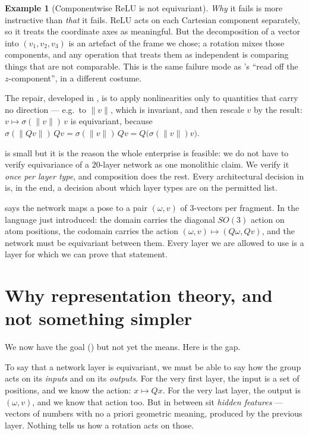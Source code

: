 \documentclass[11pt,a4paper]{report}
\theoremstyle{definition}
\newtheorem{example}[example]{Example}
\theoremstyle{remark}
\begin{document}
\begin{example}[Componentwise $\mathrm{ReLU}$ is not equivariant]
\emph{Why} it fails is more instructive than \emph{that} it fails.
$\mathrm{ReLU}$ acts on each Cartesian component separately, so it treats
the coordinate axes as meaningful. But the decomposition of a vector into
$(v_1,v_2,v_3)$ is an artefact of the frame we chose; a rotation mixes those
components, and any operation that treats them as independent is comparing
things that are not comparable. This is the same failure mode as
's ``read off the $z$-component'', in a different
costume.

The repair, developed in , is to apply
nonlinearities only to quantities that carry no direction --- e.g.\ to
$\|v\|$, which is invariant, and then rescale $v$ by the result:
$v\mapsto \sigma(\|v\|)\,v$ is equivariant, because
$\sigma(\|Qv\|)\,Qv = \sigma(\|v\|)\,Qv = Q\bigl(\sigma(\|v\|)v\bigr)$.
\end{example}

 is small but it is the reason the whole
enterprise is feasible: we do not have to verify equivariance of a
$20$-layer network as one monolithic claim. We verify it \emph{once per
layer type}, and composition does the rest. Every architectural decision in
 is, in the end, a decision about which layer types
are on the permitted list.

\begin{tcolorbox}[colback=blue!3,colframe=blue!40!black,title=Why this matters for SigmaFlow]
 says the network maps a pose to a pair
$(\omega,v)$ of $3$-vectors per fragment. In the language just introduced:
the domain carries the diagonal $SO(3)$ action on atom positions, the
codomain carries the action $(\omega,v)\mapsto(Q\omega,Qv)$, and the
network must be equivariant between them. Every layer we are allowed to use
is a layer for which we can prove that statement.
\end{tcolorbox}

\section{Why representation theory, and not something simpler}
\label{sec:why-representations}

We now have the goal () but not yet the
means. Here is the gap.

To say that a network layer is equivariant, we must be able to say how the
group acts on its \emph{inputs} and on its \emph{outputs}. For the very
first layer, the input is a set of positions, and we know the action:
$x\mapsto Qx$. For the very last layer, the output is $(\omega,v)$, and we
know that action too. But in between sit \emph{hidden features} --- vectors
of numbers with no a priori geometric meaning, produced by the previous
layer. Nothing tells us how a rotation acts on those.
\end{document}
